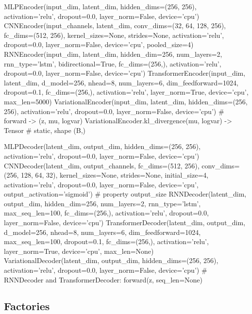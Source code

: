 \begin{pycode}
MLPEncoder(input_dim, latent_dim, hidden_dims=(256, 256), activation='relu',
           dropout=0.0, layer_norm=False, device='cpu')
CNNEncoder(input_channels, latent_dim, conv_dims=(32, 64, 128, 256),
           fc_dims=(512, 256), kernel_sizes=None, strides=None,
           activation='relu', dropout=0.0, layer_norm=False, device='cpu',
           pooled_size=4)
RNNEncoder(input_dim, latent_dim, hidden_dim=256, num_layers=2, rnn_type='lstm',
           bidirectional=True, fc_dims=(256,), activation='relu', dropout=0.0,
           layer_norm=False, device='cpu')
TransformerEncoder(input_dim, latent_dim, d_model=256, nhead=8, num_layers=6,
                   dim_feedforward=1024, dropout=0.1, fc_dims=(256,),
                   activation='relu', layer_norm=True, device='cpu',
                   max_len=5000)
VariationalEncoder(input_dim, latent_dim, hidden_dims=(256, 256),
                   activation='relu', dropout=0.0, layer_norm=False,
                   device='cpu')          # forward -> (z, mu, logvar)
VariationalEncoder.kl_divergence(mu, logvar) -> Tensor   # static, shape (B,)

MLPDecoder(latent_dim, output_dim, hidden_dims=(256, 256), activation='relu',
           dropout=0.0, layer_norm=False, device='cpu')
CNNDecoder(latent_dim, output_channels, fc_dims=(512, 256),
           conv_dims=(256, 128, 64, 32), kernel_sizes=None, strides=None,
           initial_size=4, activation='relu', dropout=0.0, layer_norm=False,
           device='cpu', output_activation='sigmoid')   # property output_size
RNNDecoder(latent_dim, output_dim, hidden_dim=256, num_layers=2,
           rnn_type='lstm', max_seq_len=100, fc_dims=(256,), activation='relu',
           dropout=0.0, layer_norm=False, device='cpu')
TransformerDecoder(latent_dim, output_dim, d_model=256, nhead=8, num_layers=6,
                   dim_feedforward=1024, max_seq_len=100, dropout=0.1,
                   fc_dims=(256,), activation='relu', layer_norm=True,
                   device='cpu', max_len=None)
VariationalDecoder(latent_dim, output_dim, hidden_dims=(256, 256),
                   activation='relu', dropout=0.0, layer_norm=False,
                   device='cpu')
# RNNDecoder and TransformerDecoder: forward(z, seq_len=None)
\end{pycode}

\subsection{Factories}


